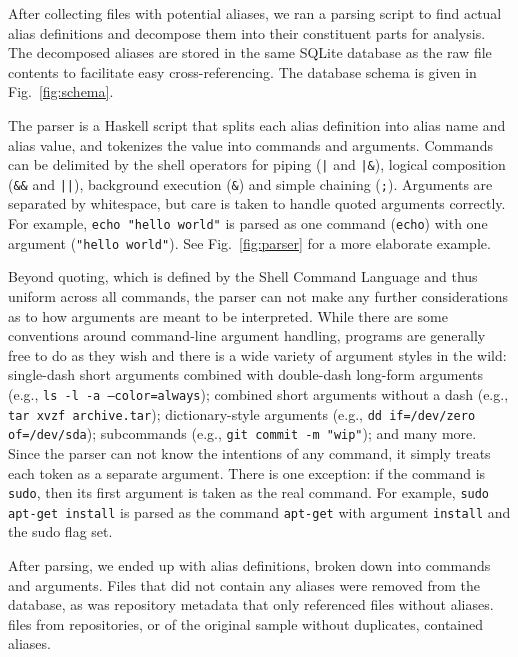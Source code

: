 \documentclass[sigconf,nonacm,screen]{acmart}
\newcommand{\num}[1]{\numprint{#1}}
\newcommand{\per}[1]{\numprint[\%]{#1}}
\newcommand{\cmd}[1]{{\texttt{#1}}}
\begin{document}
After collecting files with potential aliases, we ran a parsing script to find actual alias definitions and decompose them into their constituent parts for analysis.
The decomposed aliases are stored in the same SQLite database as the raw file contents to facilitate easy cross-referencing.
The database schema is given in Fig.~\ref{fig:schema}.

The parser is a Haskell script that splits each alias definition into alias name and alias value, and tokenizes the value into commands and arguments.
Commands can be delimited by the shell operators for piping (\verb!|! and \verb!|&!), logical composition (\verb|&&| and \verb!||!), background execution (\verb|&|) and simple chaining (\verb|;|).
Arguments are separated by whitespace, but care is taken to handle quoted arguments correctly. 
For example, \verb|echo "hello world"| is parsed as one command (\texttt{echo}) with one argument (\texttt{"hello world"}).
See Fig.~\ref{fig:parser} for a more elaborate example.

Beyond quoting, which is defined by the Shell Command Language and thus uniform across all commands, the parser can not make any further considerations as to how arguments are meant to be interpreted.
While there are some conventions around command-line argument handling, programs are generally free to do as they wish and there is a wide variety of argument styles in the wild:
single-dash short arguments combined with double-dash long-form arguments (e.g., \texttt{ls -l -a --color=always});
combined short arguments without a dash (e.g., \texttt{tar xvzf archive.tar});
dictionary-style arguments (e.g., \texttt{dd if=/dev/zero of=/dev/sda});
subcommands (e.g., \texttt{git commit -m "wip"});
and many more.
Since the parser can not know the intentions of any command, it simply treats each token as a separate argument.
There is one exception: if the command is \cmd{sudo}, then its first argument is taken as the real command. 
For example, \texttt{sudo apt-get install} is parsed as the command \cmd{apt-get} with argument \texttt{install} and the sudo flag set.

After parsing, we ended up with \num{2204199} alias definitions, broken down into \num{2534167} commands and \num{3630423} arguments.
Files that did not contain any aliases were removed from the database, as was repository metadata that only referenced files without aliases.
\num{194218} files from \num{138112} repositories, or \per{52.09} of the original sample without duplicates, contained aliases.
\end{document}
